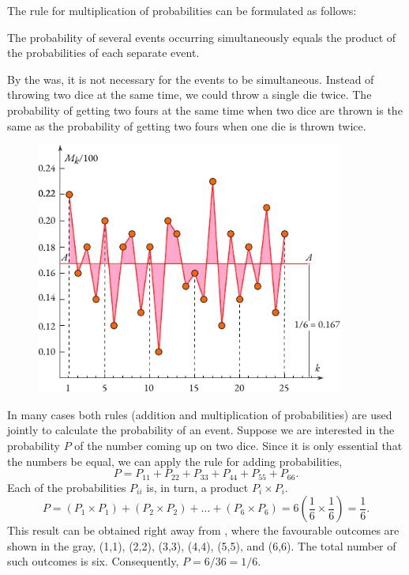 The rule for multiplication of probabilities can be formulated as
follows:
\begin{mybox}{}
The probability of several events occurring simultaneously equals the product of the probabilities of each separate event.
\end{mybox}
By the was, it is not necessary for the events to be simultaneous. Instead of throwing two dice at the same time, we could throw a
 single die twice. The probability of getting two fours at the same
 time when two dice are thrown is the same as the probability of
 getting two fours when one die is thrown twice.

 \begin{figure}[t]
 \centering
 \includegraphics[width=0.9\textwidth]{figures/die-graph.pdf}
 \end{figure}
 
 
In many cases both rules (addition and multiplication of
probabilities) are used jointly to calculate the probability of an
event. Suppose we are interested in the probability $P$ of the  number coming up on two dice. Since it is only essential that the numbers be equal, we can apply the rule for adding probabilities,
\begin{equation*}
P = P_{11} + P_{22} + P_{33} + P_{44} + P_{55} + P_{66}.
\end{equation*}
Each of the probabilities $P_{ii}$ is, in turn, a product $P_{i} \times P_{i}$. 
\begin{equation*}
P = (P_{1} \times P_{1}) + (P_{2} \times P_{2}) + \ldots + (P_{6}
\times P_{6}) = 6 \left( \dfrac{1}{6} \times \dfrac{1}{6} \right) = \dfrac{1}{6}.
\end{equation*}
This result can be obtained right away from , where
the favourable outcomes are shown in the gray, (1,1), (2,2), (3,3),
(4,4), (5,5), and (6,6). The total number of such outcomes is six. Consequently, $P = 6/36 = 1/6$.

